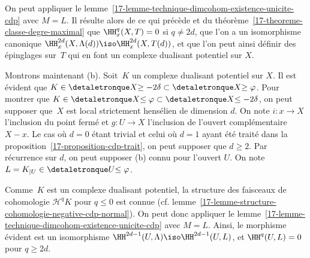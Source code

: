 \documentclass[10pt]{../fichiers-configuration-latex/smfart}
\begin{document}
\bigskip

On peut appliquer le
lemme~\ref{17-lemme-technique-dimcohom-existence-unicite-cdp}
avec $M=L$. Il résulte alors de ce qui précède et du
théorème~\ref{17-theoreme-classe-degre-maximal} que $\HH^q_x(X,T)=0$ si $q\neq
2d$, que l'on a un isomorphisme canonique 
$\HH^{2d}_x(X,\Lambda(d))\iso \HH^{2d}_x(X,T(d))$, et que l'on peut ainsi 
définir des épinglages sur $T$ qui en font un complexe dualisant potentiel
sur $X$.

\bigskip

Montrons maintenant (b). Soit $K$ un complexe dualisant potentiel sur $X$.
Il est évident que $K\in\detaletronque X {\geq -2\delta}\subset
\detaletronque X {\geq
\varphi}$. Pour montrer que $K\in \detaletronque X {\leq \varphi}\subset
\detaletronque X
{\leq -2\delta}$, on peut supposer que $X$ est local strictement hensélien
de dimension $d$.
On note $i\colon x\to X$ l'inclusion du point fermé
et $g\colon U\to X$ l'inclusion de l'ouvert complémentaire $X-x$. Le cas où
$d=0$ étant trivial et celui où $d=1$ ayant été traité dans la 
proposition~\ref{17-proposition-cdp-trait}, on peut supposer que $d\geq 2$.
Par récurrence sur $d$, on peut supposer (b) connu pour l'ouvert $U$. On
note $L=K_{|U}\in\detaletronque U {\leq\varphi}$.

Comme $K$ est un complexe dualisant potentiel, 
la structure des faisceaux de cohomologie ${\mathscr H}^qK$ pour $q\leq 0$
est connue (cf.
lemme~\ref{17-lemme-structure-cohomologie-negative-cdp-normal}). On peut 
donc appliquer le
lemme~\ref{17-lemme-technique-dimcohom-existence-unicite-cdp} avec $M=L$.
Ainsi, le morphisme évident est un isomorphisme $\HH^{2d-1}(U,\Lambda)\iso
\HH^{2d-1}(U,L)$, et $\HH^q(U,L)=0$ pour $q\geq 2d$.
\end{document}
